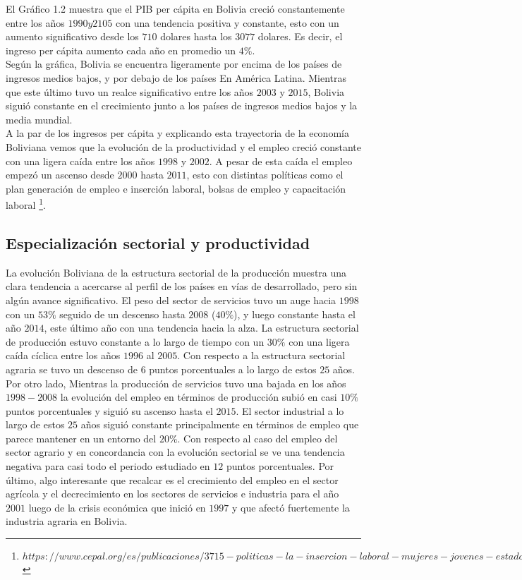     El Gráfico 1.2 muestra que el PIB per cápita en Bolivia creció constantemente entre los años $1990 y 2105$ con una tendencia positiva y constante, esto con un aumento significativo desde los $710$ dolares hasta los $3077$ dolares. Es decir, el ingreso per cápita aumento cada año en promedio un $4\%$.\\
    Según la gráfica, Bolivia se encuentra ligeramente por encima de los países de ingresos medios bajos, y por debajo de los países En América Latina. Mientras que este último tuvo un realce significativo entre los años $2003$ y $2015$, Bolivia  siguió constante en el crecimiento junto a los países de ingresos medios bajos y la media mundial.\\
    A la par de los ingresos per cápita y explicando esta trayectoria de la economía Boliviana vemos que la evolución de la productividad y el empleo  creció constante con una ligera caída entre los años $1998$ y $2002$. A pesar de esta caída el empleo empezó un ascenso desde $2000$ hasta $2011$, esto con distintas políticas como el plan generación de empleo e inserción laboral, bolsas de empleo y capacitación laboral \footnote{$https://www.cepal.org/es/publicaciones/3715-politicas-la-insercion-laboral-mujeres-jovenes-estado-plurinacional-bolivia$}.

    \subsection{Especialización sectorial y productividad}
    La evolución Boliviana de la estructura sectorial de la producción muestra una clara tendencia a acercarse al perfil de los países en vías de desarrollado, pero sin algún avance significativo. El peso del sector de servicios tuvo un auge hacia $1998$ con un $53\%$ seguido de un descenso hasta $2008$ ($40\%$), y luego constante hasta el año $2014$, este último año con una tendencia hacia la alza. La estructura sectorial de producción estuvo constante a lo largo de tiempo con un $30\%$ con una ligera caída cíclica entre los años $1996$ al $2005$. Con respecto a la estructura sectorial agraria se tuvo un descenso de $6$ puntos porcentuales a lo largo de estos $25$ años.\\

    Por otro lado, Mientras la producción de servicios tuvo una bajada en los años $1998-2008$ la evolución del empleo en términos de producción subió en casi $10\%$ puntos porcentuales y siguió su ascenso hasta el $2015$. El sector industrial a lo largo de estos $25$ años siguió constante principalmente en términos de empleo que parece mantener en un entorno del $20\%$. Con respecto al caso del empleo del sector agrario y en concordancia con la evolución sectorial se ve una tendencia negativa para casi todo el periodo estudiado en $12$ puntos porcentuales. Por último, algo interesante que recalcar es el crecimiento del empleo en el sector agrícola y el decrecimiento en los sectores de servicios e industria para el año $2001$ luego de la crisis económica que inició en $1997$ y que afectó fuertemente la industria agraria en Bolivia.\\ 

